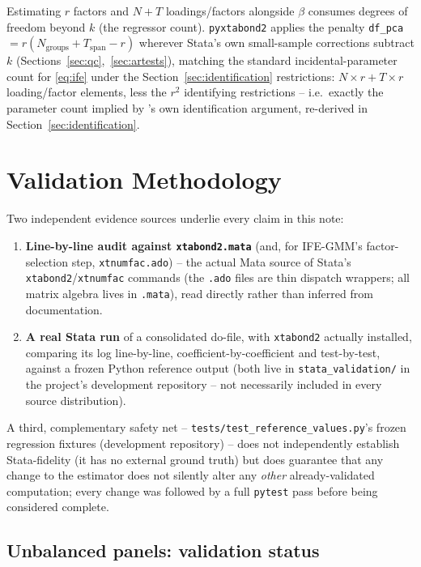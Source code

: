 \documentclass[11pt,a4paper]{article}
\newcommand{\pkg}{\texttt{pyxtabond2}}
\begin{document}
Estimating $r$ factors and $N+T$ loadings/factors alongside $\beta$ consumes
degrees of freedom beyond $k$ (the regressor count). \pkg{} applies the
penalty \texttt{df\_pca} $=r(N_{\mathrm{groups}}+T_{\mathrm{span}}-r)$
wherever Stata's own small-sample corrections subtract $k$
(Sections~\ref{sec:qc},~\ref{sec:artests}), matching the standard
incidental-parameter count for \eqref{eq:ife} under the
Section~\ref{sec:identification} restrictions: $N\times r+T\times r$
loading/factor elements, less the $r^2$ identifying restrictions -- i.e.\
exactly the parameter count implied by \citet[p.\ 1235]{Bai2009}'s own
identification argument, re-derived in Section~\ref{sec:identification}.

\section{Validation Methodology}
\label{sec:val}

Two independent evidence sources underlie every claim in this note:

\begin{enumerate}[nosep]
  \item \textbf{Line-by-line audit against \texttt{xtabond2.mata}} (and,
    for IFE-GMM's factor-selection step, \texttt{xtnumfac.ado}) -- the
    actual Mata source of Stata's \texttt{xtabond2}/\texttt{xtnumfac}
    commands (the \texttt{.ado} files are thin dispatch wrappers; all
    matrix algebra lives in \texttt{.mata}), read directly rather than
    inferred from documentation.
  \item \textbf{A real Stata run} of a consolidated do-file, with
    \texttt{xtabond2} actually installed, comparing its log line-by-line,
    coefficient-by-coefficient and test-by-test, against a frozen Python
    reference output (both live in \texttt{stata\_validation/} in the
    project's development repository -- not necessarily included in every
    source distribution).
\end{enumerate}
A third, complementary safety net -- \texttt{tests/test\_reference\_values.py}'s
frozen regression fixtures (development repository) -- does not
independently establish Stata-fidelity (it has no external ground truth)
but does guarantee that any change to the estimator does
not silently alter any \emph{other} already-validated computation; every
change was followed by a full \texttt{pytest} pass before being
considered complete.

\subsection{Unbalanced panels: validation status}
\label{sec:unbalanced}
\end{document}
